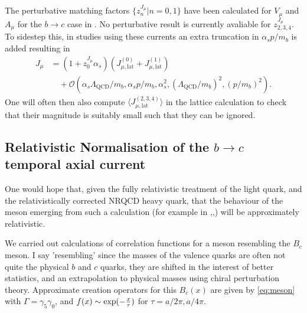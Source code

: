 The perturbative matching factors $\{z^{J_{\mu}}_n|n=0,1\}$ have been calculated for $V_{\mu}$ and $A_{\mu}$ for the $b\to c$ case in \cite{Monahan:2012dq}. No perturbative result is currently avaliable for $z^{J_{\mu}}_{2,3,4}$. To sidestep this, in studies using these currents an extra truncation in $\alpha_s p/m_b$ is added resulting in
\begin{align}
  J_{\mu} &= ( 1 + z^{J_{\mu}}_0 \alpha_s )( J_{\mu,\text{lat}}^{(0)} + J_{\mu,\text{lat}}^{(1)} ) \\ \nonumber &\quad + \mathcal{O}( \alpha_s \Lambda_{\text{QCD}} / m_b, \alpha_s p/m_b,  \alpha_s^2, (\Lambda_{\text{QCD}}/m_b)^2, (p/m_b)^2 ).
\end{align}
  One will often then also compute $\langle J_{\mu,\text{lat}}^{(2,3,4)}\rangle$ in the lattice calculation to check that their magnitude is suitably small such that they can be ignored.

\subsection{Relativistic Normalisation of the $b\to c$ temporal axial current}
\label{sec:relativistic}

One would hope that, given the fully relativistic treatment of the light quark, and the relativistically corrected NRQCD heavy quark, that the behaviour of the meson emerging 
from such a calculation (for example in \cite{Dowdall:2011wh},\cite{Colquhoun:2015oha},\cite{Colquhoun:2015mfa}) will be approximately relativistic.

We carried out calculations of correlation functions for a meson resembling the $B_c$ meson. I say 'resembling' since the masses of the valence quarks are often not 
quite the physical $b$ and $c$ quarks, they are shifted in the interest of better statistics, and an extrapolation to physical masses using chiral perturbation theory. Approximate creation operators for this $B_c(x)$ are given by \eqref{eq:meson} 
with $\Gamma = \gamma_5\gamma_0$, and $f(x) \sim \exp(-{x\over\tau})$ for $\tau=a/2\pi,a/4\pi$. 

